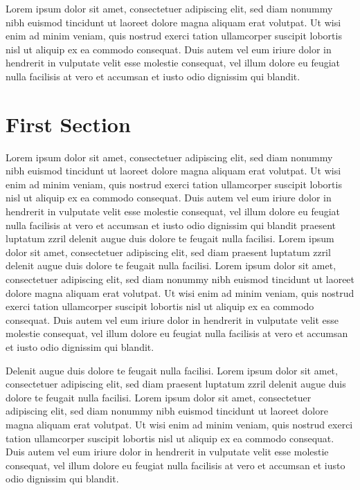 Lorem ipsum dolor sit amet, consectetuer adipiscing elit, sed diam nonummy nibh euismod tincidunt ut laoreet dolore magna aliquam erat volutpat. Ut wisi enim ad minim veniam, quis nostrud exerci tation ullamcorper suscipit lobortis nisl ut aliquip ex ea commodo consequat. Duis autem vel eum iriure dolor in hendrerit in vulputate velit esse molestie consequat, vel illum dolore eu feugiat nulla facilisis at vero et accumsan et iusto odio dignissim qui blandit.

\section{First Section}

Lorem ipsum dolor sit amet, consectetuer adipiscing elit, sed diam nonummy nibh euismod tincidunt ut laoreet dolore magna aliquam erat volutpat. Ut wisi enim ad minim veniam, quis nostrud exerci tation ullamcorper suscipit lobortis nisl ut aliquip ex ea commodo consequat. Duis autem vel eum iriure dolor in hendrerit in vulputate velit esse molestie consequat, vel illum dolore eu feugiat nulla facilisis at vero et accumsan et iusto odio dignissim qui blandit praesent luptatum zzril delenit augue duis dolore te feugait nulla facilisi. Lorem ipsum dolor sit amet, consectetuer adipiscing elit, sed diam  praesent luptatum zzril delenit augue duis dolore te feugait nulla facilisi. Lorem ipsum dolor sit amet, consectetuer adipiscing elit, sed diam nonummy nibh euismod tincidunt ut laoreet dolore magna aliquam erat volutpat. Ut wisi enim ad minim veniam, quis nostrud exerci tation ullamcorper suscipit lobortis nisl ut aliquip ex ea commodo consequat. Duis autem vel eum iriure dolor in hendrerit in vulputate velit esse molestie consequat, vel illum dolore eu feugiat nulla facilisis at vero et accumsan et iusto odio dignissim qui blandit.

Delenit augue duis dolore te feugait nulla facilisi. Lorem ipsum dolor sit amet, consectetuer adipiscing elit, sed diam  praesent luptatum zzril delenit augue duis dolore te feugait nulla facilisi. Lorem ipsum dolor sit amet, consectetuer adipiscing elit, sed diam nonummy nibh euismod tincidunt ut laoreet dolore magna aliquam erat volutpat. Ut wisi enim ad minim veniam, quis nostrud exerci tation ullamcorper suscipit lobortis nisl ut aliquip ex ea commodo consequat. Duis autem vel eum iriure dolor in hendrerit in vulputate velit esse molestie consequat, vel illum dolore eu feugiat nulla facilisis at vero et accumsan et iusto odio dignissim qui blandit.

